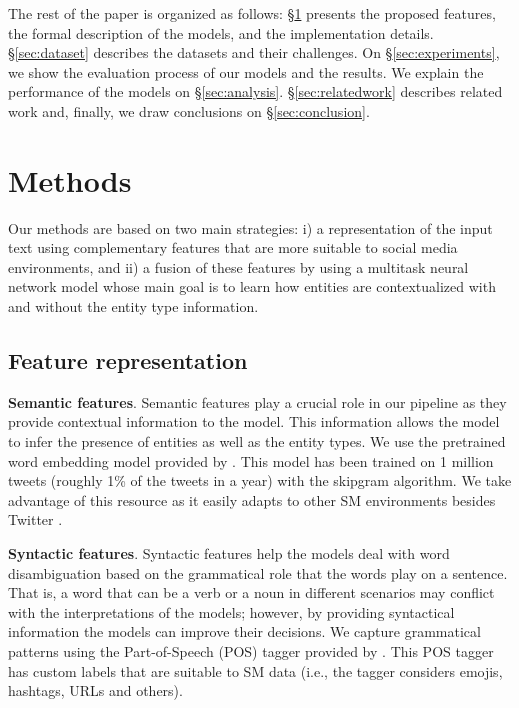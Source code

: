 \documentclass[11pt,a4paper]{article}
\begin{document}
The rest of the paper is organized as follows: \S \ref{sec:methodology} presents the proposed features, the formal description of the models, and the implementation details. \S \ref{sec:dataset} describes the datasets and their challenges. On \S \ref{sec:experiments}, we show the evaluation process of our models and the results. We explain the performance of the models on \S \ref{sec:analysis}. \S \ref{sec:relatedwork} describes related work and, finally, we draw conclusions on \S \ref{sec:conclusion}.

\section{Methods}
\label{sec:methodology}

Our methods are based on two main strategies: i) a representation of the input text using complementary features that are more suitable to social media environments, and ii) a fusion of these features by using a multitask neural network model whose main goal is to learn how entities are contextualized with and without the entity type information.

\subsection{Feature representation}

\noindent\textbf{Semantic features}. Semantic features play a crucial role in our pipeline as they provide contextual information to the model. This information allows the model to infer the presence of entities as well as the entity types. We use the pretrained word embedding model provided by \citet{godin2015multimedia}. This model has been trained on 1 million tweets (roughly 1\% of the tweets in a year) with the skipgram algorithm. We take advantage of this resource as it easily adapts to other SM environments besides Twitter \cite{AguilarEtAl:17}. 

\noindent\textbf{Syntactic features}. Syntactic features help the models deal with word disambiguation based on the grammatical role that the words play on a sentence. That is, a word that can be a verb or a noun in different scenarios may conflict with the interpretations of the models; however, by providing syntactical information the models can improve their decisions. We capture grammatical patterns using the Part-of-Speech (POS) tagger provided by \citet{owoputi2013improved}. This POS tagger has custom labels that are suitable to SM data (i.e., the tagger considers emojis, hashtags, URLs and others). 
\end{document}
